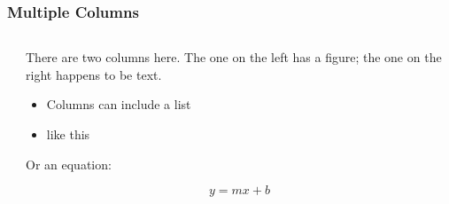 \documentclass[10pt]{beamer}
\newcommand{\nin}{\noindent}
\newcommand{\non}{\nonumber}
\newcommand{\beq}{\begin{equation}}
\newcommand{\eeq}{\end{equation}}
\newcommand{\bi}{\begin{itemize}}
\newcommand{\ei}{\end{itemize}}
\newcommand{\+}{\item}
\newcommand{\?}{\item[$\cdot$]}
\newcommand{\upone}{\vspace*{-10pt}}
\newcommand{\0}{\mathbf{0}}
\newcommand{\1}{\mathbf{1}}
\begin{document}
\begin{frame}[fragile] \frametitle{Multiple Columns}

\upone

\begin{columns}

\begin{column}{0.4\linewidth}


\end{column}

\begin{column}{0.6\linewidth}

\nin There are two columns here. The one on the left has a figure; the one on the right happens to be text.

\bigskip

\bi
\+ Columns can include a list

\+ like this
\ei

\bigskip

\nin Or an equation:

\beq
\non y=mx+b
\eeq

\end{column}

\end{columns}

\end{frame}
\end{document}
